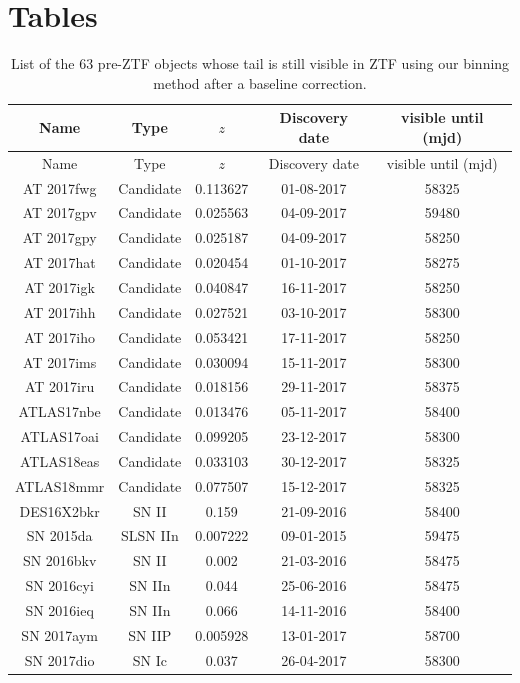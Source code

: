 \documentclass[a4paper,oneside,12pt, class=Latex/Classes/PhDthesisPSnPDF, crop=false]{standalone}
\begin{document}
\section{Tables}
\begin{longtable}{ccccc}
\caption{List of the 63 pre-ZTF objects whose tail is still visible in ZTF using our binning method after a baseline correction.}
 \label{tail_objects}
 \endfirsthead
 \hline
 \hline
 Name &  Type & $z$ & Discovery date & visible until (mjd) \\
 \hline
 \endhead
 \hline
 \endfoot
 \hline
 \endlastfoot
 \hline
 \hline
 Name &  Type & $z$ & Discovery date & visible until (mjd) \\
 \hline
 AT 2017fwg & Candidate & 0.113627 & 01-08-2017 & 58325 \\
 AT 2017gpv & Candidate &  0.025563 & 04-09-2017 & 59480\\
 AT 2017gpy & Candidate & 0.025187 & 04-09-2017 & 58250 \\
 AT 2017hat & Candidate & 0.020454 & 01-10-2017 & 58275 \\
 AT 2017igk & Candidate & 0.040847 & 16-11-2017 & 58250 \\
 AT 2017ihh & Candidate & 0.027521 & 03-10-2017 & 58300 \\
 AT 2017iho & Candidate & 0.053421 & 17-11-2017 & 58250 \\
 AT 2017ims & Candidate & 0.030094 & 15-11-2017 & 58300 \\
 AT 2017iru & Candidate & 0.018156 & 29-11-2017 & 58375 \\
 ATLAS17nbe & Candidate & 0.013476 & 05-11-2017 & 58400 \\
 ATLAS17oai & Candidate & 0.099205 & 23-12-2017 & 58300 \\
 ATLAS18eas & Candidate & 0.033103 & 30-12-2017 & 58325 \\
 ATLAS18mmr & Candidate & 0.077507 & 15-12-2017 & 58325 \\
 DES16X2bkr & SN II & 0.159 & 21-09-2016 & 58400 \\
 SN 2015da & SLSN IIn & 0.007222 & 09-01-2015 & 59475 \\
 SN 2016bkv & SN II & 0.002 & 21-03-2016 & 58475 \\
 SN 2016cyi & SN IIn & 0.044 & 25-06-2016 & 58475 \\
 SN 2016ieq & SN IIn & 0.066 & 14-11-2016 & 58400 \\
 SN 2017aym & SN IIP & 0.005928 & 13-01-2017 & 58700 \\
 SN 2017dio & SN Ic & 0.037 & 26-04-2017 & 58300 \\

\end{longtable}
\end{document}
